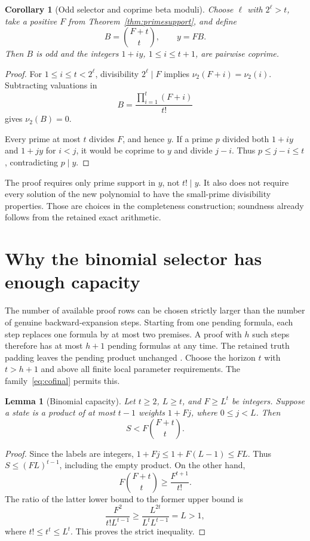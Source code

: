 \documentclass[11pt]{article}
\newtheorem{lemma}[theorem]{Lemma}
\newtheorem{corollary}[theorem]{Corollary}
\theoremstyle{definition}
\theoremstyle{remark}
\newcommand{\vval}{\nu}
\begin{document}
\begin{corollary}[Odd selector and coprime beta moduli]\label{cor:beta}
Choose $\ell$ with $2^\ell>t$, take a positive $F$ from
Theorem~\ref{thm:primesupport}, and define
\[
 B=\binom{F+t}{t},\qquad y=FB.
\]
Then $B$ is odd and the integers $1+iy$, $1\le i\le t+1$, are
pairwise coprime.
\end{corollary}
\begin{proof}
For $1\le i\le t<2^\ell$, divisibility $2^\ell\mid F$ implies
$\vval_2(F+i)=\vval_2(i)$. Subtracting valuations in
\[
 B=\frac{\prod_{i=1}^{t}(F+i)}{t!}
\]
gives $\vval_2(B)=0$.

Every prime at most $t$ divides $F$, and hence $y$. If a prime $p$
divided both $1+iy$ and $1+jy$ for $i<j$, it would be coprime to $y$
and divide $j-i$. Thus $p\le j-i\le t$, contradicting $p\mid y$.
\end{proof}

The proof requires only prime support in $y$, not $t!\mid y$. It also
does not require every solution of the new polynomial to have the
small-prime divisibility properties. Those are choices in the completeness
construction; soundness already follows from the retained exact arithmetic.

\section{Why the binomial selector has enough capacity}\label{sec:capacity}

The number of available proof rows can be chosen strictly larger than the
number of genuine backward-expansion steps. Starting from one pending
formula, each step replaces one formula by at most two premises. A proof
with $h$ such steps therefore has at most $h+1$ pending formulas at any
time. The retained truth padding leaves the pending product unchanged
\cite{parent}. Choose the horizon $t$ with $t>h+1$ and above all finite
local parameter requirements. The family~\eqref{eq:cofinal} permits this.

\begin{lemma}[Binomial capacity]\label{lem:capacity}
Let $t\ge2$, $L\ge t$, and $F\ge L^t$ be integers. Suppose a state is
a product of at most $t-1$ weights $1+Fj$, where $0\le j<L$. Then
\[
 S<F\binom{F+t}{t}.
\]
\end{lemma}
\begin{proof}
Since the labels are integers,
$1+Fj\le1+F(L-1)\le FL$. Thus
$S\le(FL)^{t-1}$, including the empty product. On the other hand,
\[
 F\binom{F+t}{t}\ge\frac{F^{t+1}}{t!}.
\]
The ratio of the latter lower bound to the former upper bound is
\[
 \frac{F^2}{t!L^{t-1}}
 \ge\frac{L^{2t}}{L^t L^{t-1}}=L>1,
\]
where $t!\le t^t\le L^t$. This proves the strict inequality.
\end{proof}
\end{document}
